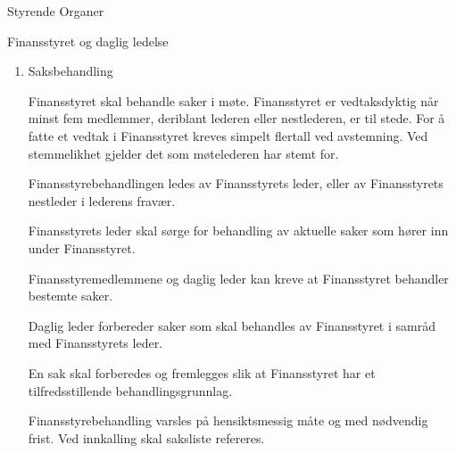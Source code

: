 \begin{lovkapittel}{Styrende Organer}
\begin{lovparagraf}{Finansstyret og daglig ledelse}
\begin{enumerate}
    Daglig leders underskrift forplikter Studentersamfundet økonomisk, i henhold til instruks gitt av Finansstyret.
    
    Den daglige ledelse omfatter ikke saker som etter Studentersamfundets forhold er av uvanlig art eller stor
    betydning. (Se § 5 Studentersamfundets høyeste myndighet).
    
    Daglig leder kan ellers avgjøre en sak etter fullmakt fra Finansstyret i det enkelte tilfellet, eller når
    Finansstyrets beslutning ikke kan avventes uten vesentlig ulempe for Studentersamfundet. Finansstyret skal
    snarest underrettes om avgjørelsen.
    
    Daglig leder skal sørge for at Studentersamfundets regnskap er i samsvar med lov og forskrifter, og at
    formuesforvaltningen er ordnet på en betryggende måte.
      
    Daglig leder skal minst hver tredje måned, i møte eller skriftlig, gi Finansstyret underretning om
    
    Studentersamfundets virksomhet, stilling og resultatutvikling.
    
    Finansstyret kan til enhver tid kreve at daglig leder gir en nærmere redegjørelse om bestemte saker. Slik
    redegjørelse kan også kreves av det enkelte medlem i Finansstyret.
    
    \item Saksbehandling
    
    Finansstyret skal behandle saker i møte. Finansstyret er vedtaksdyktig når minst fem medlemmer, deriblant
    lederen eller nestlederen, er til stede. For å fatte et vedtak i Finansstyret kreves simpelt flertall ved
    avstemning. Ved stemmelikhet gjelder det som møtelederen har stemt for.
    
    Finansstyrebehandlingen ledes av Finansstyrets leder, eller av Finansstyrets nestleder i lederens fravær.
    
    Finansstyrets leder skal sørge for behandling av aktuelle saker som hører inn under Finansstyret.
    
    Finansstyremedlemmene og daglig leder kan kreve at Finansstyret behandler bestemte saker.
    
    Daglig leder forbereder saker som skal behandles av Finansstyret i samråd med Finansstyrets leder.
    
    En sak skal forberedes og fremlegges slik at Finansstyret har et tilfredsstillende behandlingsgrunnlag.
    
    Finansstyrebehandling varsles på hensiktsmessig måte og med nødvendig frist. Ved innkalling skal saksliste
    refereres.
    

\end{enumerate}
\end{lovparagraf}
\end{lovkapittel}
